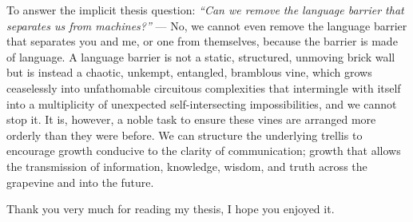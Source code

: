 

\newpage
To answer the implicit thesis question: \textit{``Can we remove the language barrier that separates us from machines?''} --- No, we cannot even remove the language barrier that separates you and me, or one from themselves, because the barrier is made of language. A language barrier is not a static, structured, unmoving brick wall but is instead a chaotic, unkempt, entangled, bramblous vine, which grows ceaselessly into unfathomable circuitous complexities that intermingle with itself into a multiplicity of unexpected self-intersecting impossibilities, and we cannot stop it. It is, however, a noble task to ensure these vines are arranged more orderly than they were before. We can structure the underlying trellis to encourage growth conducive to the clarity of communication; growth that allows the transmission of information, knowledge, wisdom, and truth across the grapevine and into the future.

\bigskip

\begin{center}
    Thank you very much for reading my thesis, I hope you enjoyed it.
\end{center}





















